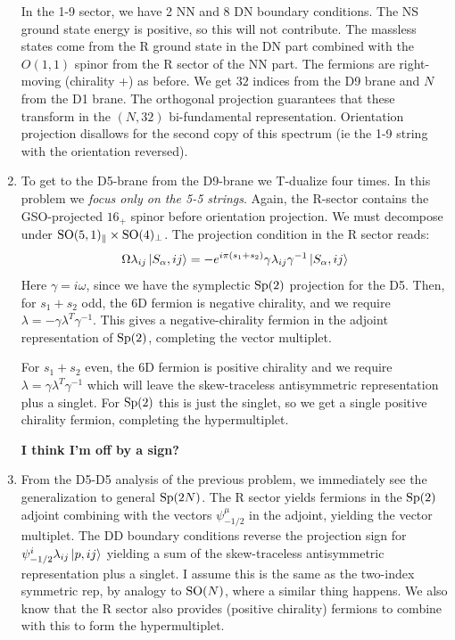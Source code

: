 \documentclass[11pt, class=article, crop=false]{standalone}
\begin{document}
\begin{enumerate}
	In the 1-9 sector, we have 2 NN and 8 DN boundary conditions. The NS ground state energy is positive, so this will not contribute. The massless states come from the R ground state in the DN part combined with the $O(1,1)$ spinor from the R sector of the NN part. The fermions are right-moving (chirality +) as before. We get $32$ indices from the D9 brane and $N$ from the D1 brane. The orthogonal projection guarantees that these transform in the $(N, 32)$ bi-fundamental representation. Orientation projection disallows for the second copy of this spectrum (ie the 1-9 string with the orientation reversed).
	
	\item To get to the D5-brane from the D9-brane we T-dualize four times. In this problem we \emph{focus only on the 5-5 strings}.
	 Again, the R-sector contains the GSO-projected $16_+$ spinor before orientation projection. We must decompose under $\mathrm{SO}(5,1)_\parallel \times \mathrm{SO}(4)_\perp$. The projection condition in the R sector reads:
	\[
		\Omega \lambda_{ij} \ket{S_\alpha, ij} = - e^{i \pi (s_1 + s_2)} \gamma \lambda_{ij} \gamma^{-1} \ket{S_\alpha, ij}
	\]
	Here $\gamma = i \omega$, since we have the symplectic $\mathrm{Sp}(2)$ projection for the D5. Then, for $s_1 + s_2$ odd, the 6D fermion is negative chirality, and we require $\lambda = - \gamma \lambda^T \gamma^{-1}$. This gives a negative-chirality fermion in the adjoint representation of $\mathrm{Sp}(2)$, completing the vector multiplet. 
	
	For $s_1 + s_2$ even, the 6D fermion is positive chirality and we require $\lambda = \gamma \lambda^T \gamma^{-1}$ which will leave the skew-traceless antisymmetric  representation plus a singlet. For $\mathrm{Sp}(2)$ this is just the singlet, so we get a single positive chirality fermion, completing the hypermultiplet. 
	
	\textbf{I think I'm off by a sign?}
	
	
	\item From the D5-D5 analysis of the previous problem, we immediately see the generalization to general $\mathrm{Sp}(2N)$. The R sector yields fermions in the $\mathrm{Sp}(2)$ adjoint combining with the vectors $\psi_{-1/2}^\mu$  in the adjoint, yielding the vector multiplet. The DD boundary conditions reverse the projection sign for $\psi_{-1/2}^i \lambda_{ij} \ket{p, ij}$ yielding a sum of the skew-traceless antisymmetric representation plus a singlet. I assume this is the same as the two-index symmetric rep, by analogy to $\mathrm{SO}(N)$, where a similar thing happens. We also know that the R sector also provides (positive chirality) fermions to combine with this to form the hypermultiplet. 
	

\end{enumerate}
\end{document}
